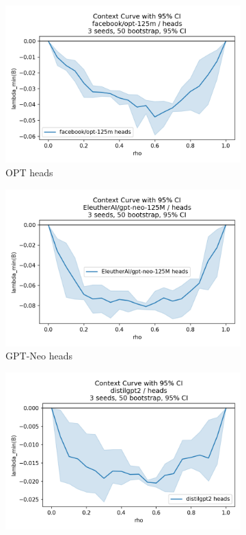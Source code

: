 \documentclass[11pt]{article}
\newcommand{\1}{\mathbf{1}}
\begin{document}
\begin{figure}[t]
\begin{subfigure}[t]{0.32\textwidth}
\includegraphics[width=\linewidth]{figs/curve_facebook_opt-125m_heads.png}
\caption{OPT heads}
\end{subfigure}\hfill
\begin{subfigure}[t]{0.32\textwidth}
\includegraphics[width=\linewidth]{figs/curve_EleutherAI_gpt-neo-125M_heads.png}
\caption{GPT-Neo heads}
\end{subfigure}\hfill
\begin{subfigure}[t]{0.32\textwidth}
\includegraphics[width=\linewidth]{figs/curve_distilgpt2_heads.png}

\end{subfigure}
\end{figure}
\end{document}
